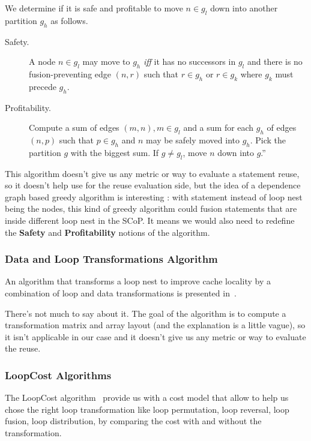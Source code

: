\documentclass[paper=a4, fontsize=11.5pt]{scrartcl}
\numberwithin{equation}{section}        %
\numberwithin{figure}{section}          %
\numberwithin{table}{section}               %
\begin{document}
                We determine if it is safe and profitable to move $n \in g_l$ down
                into another partition $g_h$ as follows.
                \begin{description}
                    \item [Safety.] A node $n \in g_l$ may move to $g_h$ \textit{iff} it
                        has no successors in $g_l$ and there is no fusion-preventing
                        edge $(n,r)$ such that $r \in g_h$ or $r \in g_k$ where
                        $g_k$ must precede $g_h$.
                    \item [Profitability.] Compute a sum of edges $(m,n), m \in g_l$
                        and a sum for each $g_h$ of edges $(n,p)$ such that $p \in g_h$
                        and $n$ may be safely moved into $g_h$. Pick the partition
                        $g$ with the biggest sum. If $g \neq g_l$, move $n$ down into $g$.''
                \end{description}
            \bigskip
            
            This algorithm doesn't give us any metric or way to evaluate a statement
            reuse, so it doesn't help use for the reuse evaluation side, but the idea
            of a dependence graph based greedy algorithm is interesting : with statement
            instead of loop nest being the nodes, this kind of greedy algorithm 
            could fusion statements that are inside different loop nest in the SCoP.
            It means we would also need to redefine the \textbf{Safety} and \textbf{Profitability}
            notions of the algorithm.

        \subsubsection{Data and Loop Transformations Algorithm}
            An algorithm that transforms a loop nest to improve cache locality
            by a combination of loop and data transformations is presented in~\cite{Kandemir99improvingcache}.

            There's not much to say about it. The goal of the algorithm is to
            compute a transformation matrix and array layout (and the explanation is a little
            vague), so it isn't applicable in our case and it doesn't give us any metric or way to evaluate the reuse.
        
        \subsubsection{LoopCost Algorithms}
            The LoopCost algorithm~\cite{McKinley:1996:IDL:233561.233564} provide
            us with a cost model that allow to help us chose the right loop transformation like
            loop permutation, loop reversal, loop fusion, loop distribution,
            by comparing the cost with and without the transformation.
            
\end{document}
